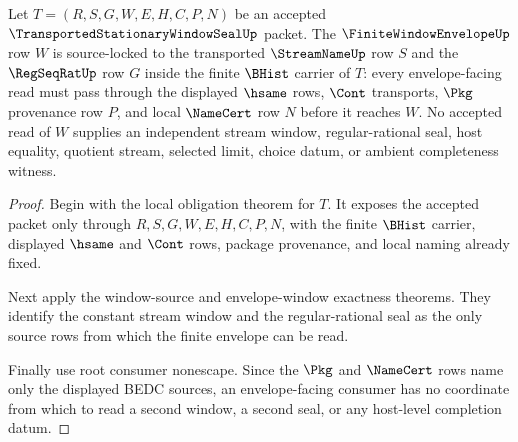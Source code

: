 \begin{theorem}
\label{thm:transported-stationary-window-seal-window-envelope-source-lock}
Let $T=(R,S,G,W,E,H,C,P,N)$ be an accepted $\TransportedStationaryWindowSealUp$ packet. The $\FiniteWindowEnvelopeUp$ row $W$ is source-locked to the transported $\StreamNameUp$ row $S$ and the $\RegSeqRatUp$ row $G$ inside the finite $\BHist$ carrier of $T$: every envelope-facing read must pass through the displayed $\hsame$ rows, $\Cont$ transports, $\Pkg$ provenance row $P$, and local $\NameCert$ row $N$ before it reaches $W$. No accepted read of $W$ supplies an independent stream window, regular-rational seal, host equality, quotient stream, selected limit, choice datum, or ambient completeness witness.
\end{theorem}
\begin{proof}
Begin with the local obligation theorem for $T$. It exposes the accepted packet only through $R,S,G,W,E,H,C,P,N$, with the finite $\BHist$ carrier, displayed $\hsame$ and $\Cont$ rows, package provenance, and local naming already fixed.

Next apply the window-source and envelope-window exactness theorems. They identify the constant stream window and the regular-rational seal as the only source rows from which the finite envelope can be read.

Finally use root consumer nonescape. Since the $\Pkg$ and $\NameCert$ rows name only the displayed BEDC sources, an envelope-facing consumer has no coordinate from which to read a second window, a second seal, or any host-level completion datum.
\end{proof}

